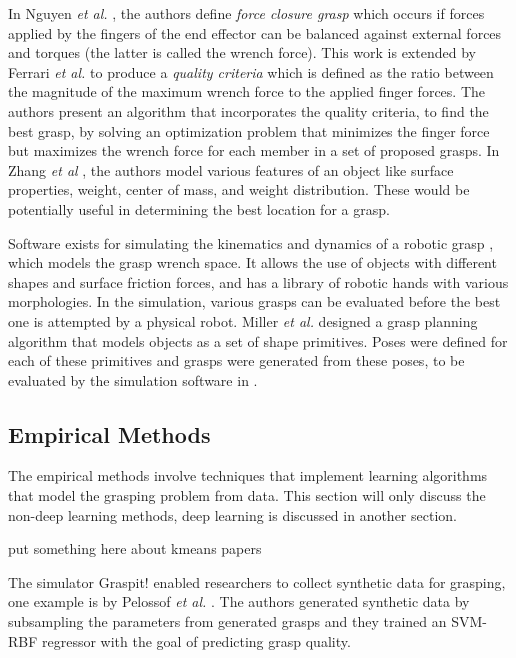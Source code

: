 \documentclass{article}
\begin{document}
In Nguyen \textit{et al.} \cite{nguyen86}, the authors define
\textit{force closure grasp}
which occurs if forces applied by the fingers of the end
effector can be balanced against external forces and torques
(the latter is called the wrench force). This work is extended by Ferrari
\textit{et al.} \cite{ferrari92} to produce a \textit{quality criteria}
which is defined as
the ratio between the magnitude of the maximum wrench force to the
applied finger forces. The authors present an algorithm that incorporates the
quality criteria, to find the best grasp, by solving an optimization problem
that minimizes the finger force but maximizes the wrench force for each member
in a set of proposed grasps. In Zhang \textit{et al} \cite{zhang12}, the authors
model various features of an object like surface properties, weight, center
of mass, and weight distribution. These would be potentially useful in
determining the best location for a grasp.

Software exists for simulating the kinematics and dynamics of a robotic
grasp \cite{miller04}, which models the grasp wrench space. It allows the use
of objects with different shapes and surface friction forces, and has a library
of robotic hands with various morphologies. In the simulation, various grasps
can be evaluated before the best one is attempted by a physical robot. Miller
\textit{et al.} \cite{miller03} designed a grasp planning algorithm that
models objects as a
set of shape primitives. Poses were defined for each of
these primitives and grasps
were generated from these poses, to be evaluated by the simulation software in
\cite{miller04}.

\subsection{Empirical Methods}
The empirical methods involve techniques that implement learning algorithms that
model the grasping problem from data. This section will only discuss the
non-deep learning methods, deep learning is discussed in another section.

put something here about kmeans papers \cite{coelho01,piater02}

The simulator Graspit! \cite{miller04} enabled researchers to collect synthetic
data for grasping, one example is by Pelossof \textit{et al.} \cite{pelossof04}.
The authors generated synthetic data by subsampling the parameters from
generated grasps and they trained an
SVM-RBF regressor with the goal of predicting grasp quality.
\end{document}
